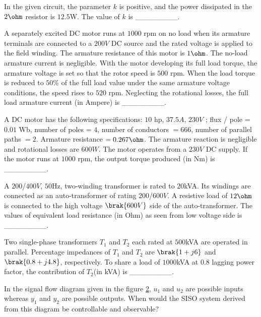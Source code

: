     \item In the given circuit, the parameter $k$ is positive, and the power dissipated in the $2 \ohm$ resistor is $12.5$W. The value of $k$ is \_\_\_\_\_\_\_\_.
        \begin{figure}[H]
            \centering
            
            \caption{}
            \label{fig57}
        \end{figure}

    \item A separately excited DC motor runs at $1000$ rpm on no load when its armature terminals are connected to a $200V$ DC source and the rated voltage is applied to the field winding. The armature resistance of this motor is $1  \ohm$. The no-load armature current is negligible. With the motor developing its full load torque, the armature voltage is set so that the rotor speed is $500$ rpm. When the load torque is reduced to $50\%$ of the full load value under the same armature voltage conditions, the speed rises to $520$ rpm. Neglecting the rotational losses, the full load armature current (in Ampere) is \_\_\_\_\_\_\_\_.
    \item A DC motor has the following specifications: $10$ hp, $37.5A$, $230V$ ; flux / pole = $0.01$ Wb, number of poles = $4$, number of conductors $=666$, number of parallel paths $=2$. Armature resistance $=0.267 \ohm$. The armature reaction is negligible and rotational losses are $600W$. The motor operates from a $230V$ DC supply. If the motor runs at $1000$ rpm, the output torque produced (in Nm) is \_\_\_\_\_\_\_\_.
    \item A $200$/$400 V$, $50$Hz, two-winding transformer is rated to $20$kVA. Its windings are connected as an auto-transformer of rating $200$/$600V$. A resistive load of $12 \ohm$ is connected to the high voltage $\brak{600V}$ side of the auto-transformer. The values of equivalent load resistance (in Ohm) as seen from low voltage side is \_\_\_\_\_\_\_\_.
    \item Two single-phase transformers $T_1$ and $T_2$ each rated at $500$kVA are operated in parallel. Percentage impedances of $T_1$ and $T_2$ are $\brak{1 + j6}$ and $\brak{0.8 + j4.8}$, respectively. To share a load of $1000$kVA at $0.8$ lagging power factor, the contribution of $T_2$(in kVA) is \_\_\_\_\_\_\_\_.

    \item In the signal flow diagram given in the figure \ref{fig62}, $u_1$ and $u_2$ are possible inputs whereas $y_1$ and $y_2$ are possible outputs. When would the SISO system derived from this diagram be controllable and observable?
    \begin{figure}[H]
        \centering
        
        \caption{}
        \label{fig62}
    \end{figure}

